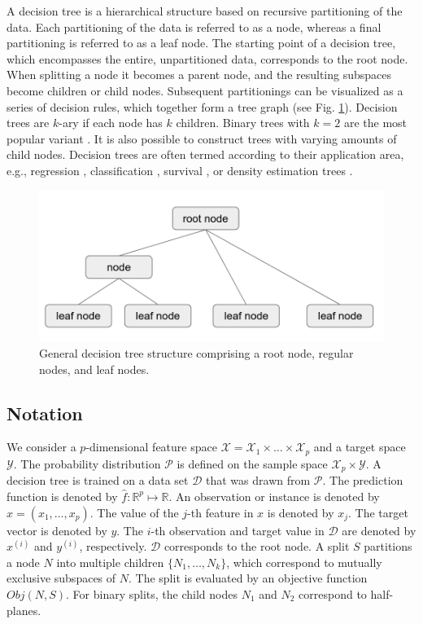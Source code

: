 \documentclass[a4paper, 11pt]{article}
\begin{document}
A decision tree is a hierarchical structure based on recursive partitioning of the data. Each partitioning of the data is referred to as a node, whereas a final partitioning is referred to as a leaf node. The starting point of a decision tree, which encompasses the entire, unpartitioned data, corresponds to the root node. 
When splitting a node it becomes a parent node, and the resulting subspaces become children or child nodes. Subsequent partitionings can be visualized as a series of decision rules, which together form a tree graph (see Fig. \ref{fig:tree_structure}). Decision trees are $k$-ary if each node has $k$ children.
Binary trees with $k = 2$ are the most popular variant \cite{hastie_elemstatlearn}. It is also possible to construct trees with varying amounts of child nodes. Decision trees are often termed according to their application area, e.g., regression \cite{cart_1}, classification \cite{quinlan_c45, cart_1, kass_chaid}, survival \cite{derose_survival_tree}, or density estimation trees \cite{ram_density_estimation_tree}.

\begin{figure}
    \centering
    \includegraphics[width = 0.6 \linewidth]{thesis/figure/tree_structure.png}
    \caption{General decision tree structure comprising a root node, regular nodes, and leaf nodes.}
    \label{fig:tree_structure}
\end{figure}

\subsection{Notation}

We consider a $p$-dimensional feature space $\mathcal{X} = \mathcal{X}_1 \times \dots \times \mathcal{X}_p$ and a target space $\mathcal{Y}$. The probability distribution $\mathcal{P}$ is defined on the sample space $\mathcal{X}_p \times \mathcal{Y}$. A decision tree is trained on a data set $\mathcal{D}$ that was drawn from $\mathcal{P}$. The prediction function is denoted by $\widehat{f}: \mathbb{R}^p \mapsto \mathbb{R}$. An observation or instance is denoted by $x = (x_1, \dots, x_p)$. The value of the $j$-th feature in $x$ is denoted by $x_j$. The target vector is denoted by $y$. The $i$-th observation and target value in $\mathcal{D}$ are denoted by $x^{(i)}$ and $y^{(i)}$, respectively. $\mathcal{D}$ corresponds to the root node. A split $S$ partitions a node $N$ into multiple children $\{N_1, \dots, N_k\}$, which correspond to mutually exclusive subspaces of $N$. The split is evaluated by an objective function $Obj(N, S)$. For binary splits, the child nodes $N_1$ and $N_2$ correspond to half-planes.
\end{document}
